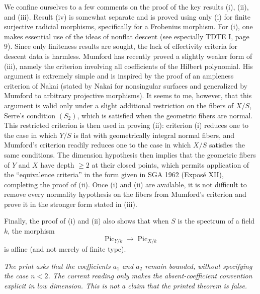 We confine ourselves to a few comments on the proof of the key results (i),
(ii), and (iii). Result (iv) is somewhat separate and is proved using only (i)
for finite surjective radicial morphisms, specifically for a Frobenius
morphism. For (i), one makes essential use of the ideas of nonflat descent
(see especially TDTE I, page 9). Since only finiteness results are sought, the
lack of effectivity criteria for descent data is harmless. Mumford has
recently proved a slightly weaker form of (iii), namely the criterion involving
all coefficients of the Hilbert polynomial. His argument is extremely simple
and is inspired by the proof of an ampleness criterion of Nakai (stated by
Nakai for nonsingular surfaces and generalized by Mumford to arbitrary
projective morphisms). It seems to me, however, that this argument is valid
only under a slight additional restriction on the fibers of $X/S$, Serre's
condition $(S_2)$, which is satisfied when the geometric fibers are normal.
This restricted criterion is then used in proving (ii): criterion (i) reduces
one to the case in which $Y/S$ is flat with geometrically integral normal
fibers, and Mumford's criterion readily reduces one to the case in which $X/S$
satisfies the same conditions. The dimension hypothesis then implies that the
geometric fibers of $Y$ and $X$ have depth $\geq2$ at their closed points,
which permits application of the “equivalence criteria” in the form given in
SGA 1962 (Exposé XII), completing the proof of (ii). Once (i) and (ii) are
available, it is not difficult to remove every normality hypothesis on the
fibers from Mumford's criterion and prove it in the stronger form stated in
(iii).

Finally, the proof of (i) and (ii) also shows that when $S$ is the spectrum of
a field $k$, the morphism
\[
\operatorname{Pic}_{Y/k}\longrightarrow\operatorname{Pic}_{X/k}
\]
is affine (and not merely of finite type).

\par\smallskip
\begingroup\footnotesize
\noindent\textit{The print asks that the coefficients $a_1$ and $a_2$ remain bounded, without specifying the case $n<2$. The current reading only makes the absent-coefficient convention explicit in low dimension. This is not a claim that the printed theorem is false.}\par
\endgroup
